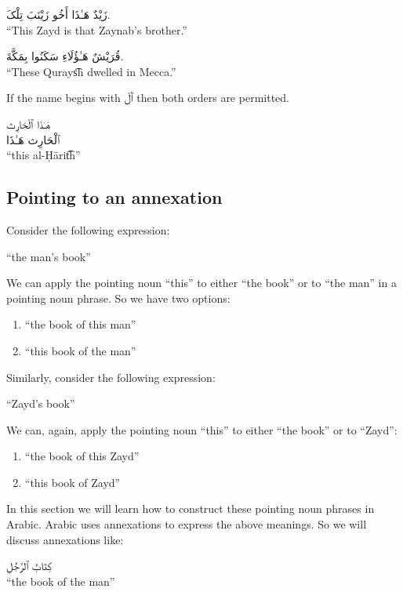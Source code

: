 \documentclass[
  10pt,
]{book}
\providecommand{\tightlist}{%
  \setlength{\itemsep}{0pt}\setlength{\parskip}{0pt}}
\begin{document}
\foreignlanguage{arabic}{زَيْدٌ هَـٰذَا أَخُو زَيْنَبَ تِلْکَ.}\\
\enquote{This Zayd is that Zaynab's brother.}

\foreignlanguage{arabic}{قُرَيْشٌ هَـٰؤُلَاءِ سَکَنُوا بِمَکَّةَ.}\\
\enquote{These Qurays͡h dwelled in Mecca.}

If the name begins with \foreignlanguage{arabic}{ٱَلْ} then both orders are permitted.

\foreignlanguage{arabic}{هَـٰذَا ٱلْحَارِث}\\
\foreignlanguage{arabic}{ٱلْحَارِث هَـٰذَا}\\
\enquote{this al-Ḥārit͡h}

\subsection{Pointing to an annexation}\label{pointing-to-an-annexation}

Consider the following expression:

\enquote{the man's book}

We can apply the pointing noun \enquote{this} to either \enquote{the book} or to \enquote{the man} in a pointing noun phrase. So we have two options:

\begin{enumerate}
\def\labelenumi{\roman{enumi}.}
\tightlist
\item
  \enquote{the book of this man}
\item
  \enquote{this book of the man}
\end{enumerate}

Similarly, consider the following expression:

\enquote{Zayd's book}

We can, again, apply the pointing noun \enquote{this} to either \enquote{the book} or to \enquote{Zayd}:

\begin{enumerate}
\def\labelenumi{\roman{enumi}.}
\tightlist
\item
  \enquote{the book of this Zayd}
\item
  \enquote{this book of Zayd}
\end{enumerate}

In this section we will learn how to construct these pointing noun phrases in Arabic.
Arabic uses annexations to express the above meanings. So we will discuss annexations like:

\foreignlanguage{arabic}{کِتَابُ ٱلرَّجُلِ}\\
\enquote{the book of the man}
\end{document}
